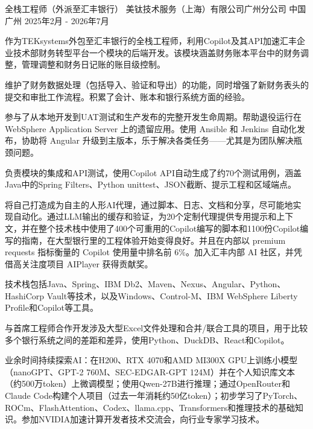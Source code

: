 
\begin{cventries}

  \cventry
    {全栈工程师（外派至汇丰银行）} %
    {美钛技术服务（上海）有限公司广州分公司} %
    {中国广州} %
    {2025年2月 - 2026年7月} %
    {
      \begin{cvitems} %
        \item {作为TEKsystems外包至汇丰银行的全栈工程师，利用Copilot及其API加速汇丰企业技术部财务转型平台一个模块的后端开发。该模块涵盖财务账本平台中的财务调整，管理调整和财务日记账的账目级控制。}
        \item {维护了财务数据处理（包括导入、验证和导出）的功能，同时增强了新财务表头的提交和审批工作流程。积累了会计、账本和银行系统方面的经验。}
        \item {参与了从本地开发到UAT测试和生产发布的完整开发生命周期。帮助退役运行在 WebSphere Application Server 上的遗留应用。使用 Ansible 和 Jenkins 自动化发布，协助将 Angular 升级到主版本，乐于解决各类任务——尤其是为团队解决瓶颈问题。}
        \item {负责模块的集成和API测试，使用Copilot API自动生成了约70个测试用例，涵盖Java中的Spring Filters、Python unittest、JSON截断、提示工程和区域端点。}
        \item {将自己打造成为自主的人形AI代理，通过脚本、日志、文档和分享，尽可能地实现自动化。通过LLM输出的缓存和验证，为20个定制代理提供专用提示和上下文，并在整个技术栈中使用了400个可重用的Copilot编写的脚本和1100份Copilot编写的指南，在大型银行里的工程体验开始变得良好。并且在内部以 premium requests 指标衡量的 Copilot 使用量中排名前 6\%。加入汇丰内部 AI 社区，并凭借高关注度项目 AIPlayer 获得贡献奖。}
        \item {技术栈包括Java、Spring、IBM Db2、Maven、Nexus、Angular、Python、HashiCorp Vault等技术，以及Windows、Control-M、IBM WebSphere Liberty Profile和Copilot等工具。}
        \item {与首席工程师合作开发涉及大型Excel文件处理和合并/联合工具的项目，用于比较多个银行系统之间的差距和差异，使用Python、DuckDB、React和Copilot。}
        \item {业余时间持续探索AI：在H200、RTX 4070和AMD MI300X GPU上训练小模型（nanoGPT、GPT-2 760M、SEC-EDGAR-GPT 124M）并在个人知识库文本（约500万token）上微调模型；使用Qwen-27B进行推理；通过OpenRouter和Claude Code构建个人项目（过去一年消耗约50亿token）；初步学习了PyTorch、ROCm、FlashAttention、Codex、llama.cpp、Transformers和推理技术的基础知识。参加NVIDIA加速计算开发者技术交流会，向行业专家学习技术。}
      \end{cvitems}
    }


\end{cventries}

